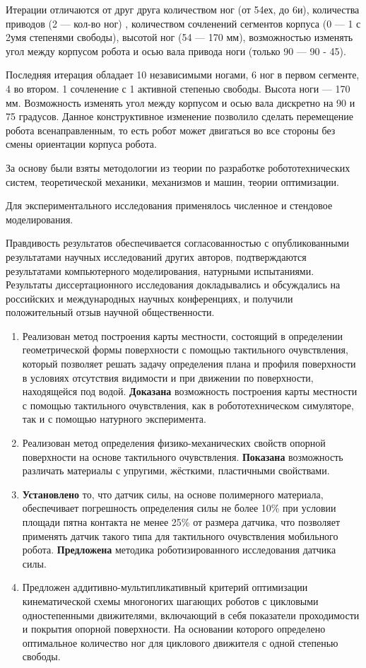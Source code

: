 Итерации отличаются от друг друга количеством ног (от 54ех, до 6и), количества приводов (2 --- кол-во ног) , количеством сочленений сегментов корпуса (0 --- 1 с 2умя степенями свободы), высотой ног (54 --- 170 мм), возможностью изменять угол между корпусом робота и осью вала привода ноги (только 90 --- 90 - 45). 

Последняя итерация  обладает 10 независимыми ногами, 6 ног в первом сегменте, 4 во втором. 1 сочленение с 1 активной степенью свободы. Высота ноги --- 170 мм. Возможность изменять угол между корпусом и осью вала дискретно на 90 и 75 градусов. Данное конструктивное изменение позволило сделать перемещение робота всенаправленным, то есть робот может двигаться во все стороны без смены ориентации корпуса робота.


{\methods} За основу были взяты методологии из теории по разработке робототехнических систем, теоретической механики, механизмов и машин, теории оптимизации.

Для экспериментального исследования применялось численное и стендовое моделирования.

{\reliability} Правдивость результатов обеспечивается согласованностью с опубликованными результатами научных исследований других авторов, подтверждаются результатами компьютерного моделирования, натурными испытаниями. Результаты диссертационного исследования докладывались и обсуждались на российских и международных научных конференциях, и получили положительный отзыв научной общественности.


{\novelty} 
\begin{enumerate}
    \item Реализован метод построения карты местности, состоящий в определении геометрической формы поверхности с помощью тактильного очувствления, который позволяет решать задачу определения плана и профиля поверхности в условиях отсутствия видимости и при движении по поверхности, находящейся под водой. \textbf{Доказана} возможность построения карты местности с помощью тактильного очувствления, как в робототехническом симуляторе, так и с помощью натурного эксперимента.
    \item Реализован метод определения физико-механических свойств опорной поверхности на основе тактильного очувствления. \textbf{Показана} возможность различать материалы с упругими, жёсткими, пластичными свойствами.
    \item \textbf{Установлено} то, что датчик силы, на основе полимерного материала, обеспечивает погрешность определения силы не более 10\% при условии площади пятна контакта не менее 25\% от размера датчика, что позволяет применять датчик такого типа для тактильного очувствления мобильного робота. \textbf{Предложена} методика роботизированного исследования датчика силы.
    \item Предложен аддитивно-мультипликативный критерий оптимизации кинематической схемы многоногих шагающих роботов с цикловыми одностепенными движителями, включающий в себя показатели проходимости и покрытия опорной поверхности. На основании которого определено оптимальное количество ног для циклового движителя с одной степенью свободы.
\end{enumerate}

